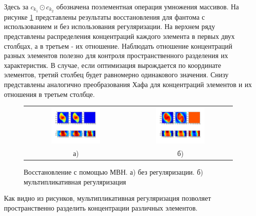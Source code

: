 Здесь за $c_{k_1} \odot c_{k_2}$ обозначена поэлементная операция умножения массивов.
На рисунке \ref{fig:whiteres} представлены результаты восстановления для фантома с использованием и без использования регуляризации.
На верхнем ряду представлены распределения концентраций каждого элемента в первых двух столбцах, а в третьем - их отношение.
Наблюдать отношение концентраций разных элементов полезно для контроля пространственного разделения их характеристик.
В случае, если оптимизация вырождается по координате элементов, третий столбец будет равномерно одинакового значения.
Снизу представлены аналогично преобразования Хафа для концентраций элементов и их отношения в третьем столбце.

\begin{figure}
\label{fig:whiteres}
\centering
\begin{tabular}{@{}c@{}c}
  \includegraphics[width=0.5\textwidth]{Dissertation/images/part3_img/no_reg_iteration_25} &
  \includegraphics[width=0.5\textwidth]{Dissertation/images/part3_img/mul_reg_iteration_150}
  \\
  а) &
  б) \\
\end{tabular}
\caption{Восстановление с помощью МВН. а) без регуляризации. б) мультипликативная регуляризация}
\vspace{5mm}
\end{figure}


Как видно из рисунков, мультипликативная регуляризация позволяет пространственно разделить концентрации различных элементов.

